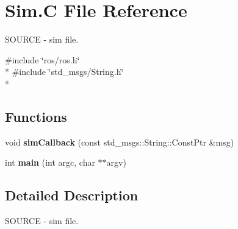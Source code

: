 \hypertarget{Sim_8C}{\section{Sim.\-C File Reference}
\label{Sim_8C}
}


S\-O\-U\-R\-C\-E -\/ sim file.  


{\ttfamily \#include \char`\"{}ros/ros.\-h\char`\"{}}\\*
{\ttfamily \#include \char`\"{}std\-\_\-msgs/\-String.\-h\char`\"{}}\\*
\subsection*{Functions}
\begin{DoxyCompactItemize}
\item 
\hypertarget{Sim_8C_aceb80954fe01ad5ff16a49ea712a8142}{void {\bfseries sim\-Callback} (const std\-\_\-msgs\-::\-String\-::\-Const\-Ptr \&msg)}\label{Sim_8C_aceb80954fe01ad5ff16a49ea712a8142}

\item 
\hypertarget{Sim_8C_a3c04138a5bfe5d72780bb7e82a18e627}{int {\bfseries main} (int argc, char $\ast$$\ast$argv)}\label{Sim_8C_a3c04138a5bfe5d72780bb7e82a18e627}

\end{DoxyCompactItemize}


\subsection{Detailed Description}
S\-O\-U\-R\-C\-E -\/ sim file. 